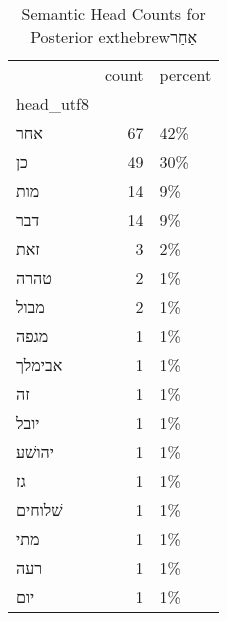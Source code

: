 \begin{table}[htbp!]
\centering
\caption{Semantic Head Counts for Posterior 	exthebrew{אַחַר}}
\label{table:post_>XR_head_ct}
\begin{tabular}{lrl}
\toprule
{} &  count & percent \\
head\_utf8 &        &         \\
\midrule
אחר       &     67 &     42\% \\
כן        &     49 &     30\% \\
מות       &     14 &      9\% \\
דבר       &     14 &      9\% \\
זאת       &      3 &      2\% \\
טהרה      &      2 &      1\% \\
מבול      &      2 &      1\% \\
מגפה      &      1 &      1\% \\
אבימלך    &      1 &      1\% \\
זה        &      1 &      1\% \\
יובל      &      1 &      1\% \\
יהושׁע    &      1 &      1\% \\
גז        &      1 &      1\% \\
שׁלוחים   &      1 &      1\% \\
מתי       &      1 &      1\% \\
רעה       &      1 &      1\% \\
יום       &      1 &      1\% \\
\bottomrule
\end{tabular}
\end{table}
